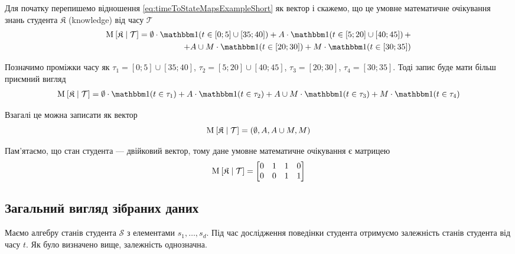 Для початку перепишемо відношення \eqref{eq:timeToStateMapsExampleShort} як
вектор і скажемо, що це умовне математичне очікування знань студента
$\mathfrak{K}$ (knowledge) від часу $\mathcal{T}$
\begin{align*}
  \Mean{\mathfrak{K} \mcond \mathcal{T}} =
    \emptyset \cdot
      \indicator{t \in \left[ 0; 5 \right] \cup \left[ 35; 40 \right]}
    + A \cdot
      \indicator{t \in \left[ 5; 20 \right] \cup \left[ 40; 45 \right]} + \\
    + A \cup M \cdot \indicator{t \in \left[ 20; 30 \right]}
    + M \cdot \indicator{t \in \left[ 30; 35 \right]}
\end{align*}

Позначимо проміжки часу як
$\tau_1 = \left[ 0; 5 \right] \cup \left[ 35; 40 \right]$,
$\tau_2 = \left[ 5; 20 \right] \cup \left[ 40; 45 \right]$,
$\tau_3 = \left[ 20; 30 \right]$,
$\tau_4 = \left[ 30; 35 \right]$.
Тоді запис буде мати більш приємний вигляд
\begin{align*}
  \Mean{\mathfrak{K} \mcond \mathcal{T}} =
  \emptyset \cdot \indicator{t \in \tau_1} + A \cdot \indicator{t \in \tau_2}
  + A \cup M \cdot \indicator{t \in \tau_3} + M \cdot \indicator{t \in \tau_4}
\end{align*}

Взагалі це можна записати як вектор
\begin{equation*}
  \operatorname{M}_{} \left[ \mathfrak{K} \;\middle|\; \mathcal{T} \right] =
  \left( \emptyset, A, A \cup M, M \right)
\end{equation*}

Пам’ятаємо, що стан студента --- двійковий вектор, тому дане умовне математичне
очікування є матрицею
\begin{equation*}
  \operatorname{M}_{} \left[ \mathfrak{K} \;\middle|\; \mathcal{T} \right] =
  \begin{bmatrix}
    0 & 1 & 1 & 0 \\
    0 & 0 & 1 & 1
  \end{bmatrix}
\end{equation*}

\subsection{Загальний вигляд зібраних даних}

Маємо алгебру станів студента $\mathcal{S}$ з елементами $s_1, \dots, s_d$.
Під час дослідження поведінки студента отримуємо залежність станів студента
від часу $t$. Як було визначено вище, залежність однозначна.

